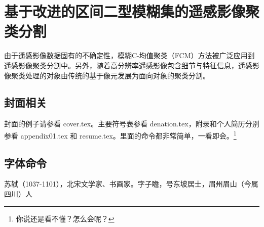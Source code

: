 
\chapter{基于改进的区间二型模糊集的遥感影像聚类分割}
\label{cha:chap03}

由于遥感影像数据固有的不确定性，模糊C-均值聚类（FCM）方法被广泛应用到遥感影像聚类分割中。另外，随着高分辨率遥感影像包含细节与特征信息，遥感影像聚类处理的对象由传统的基于像元发展为面向对象的聚类分割。

\section{封面相关}
封面的例子请参看 cover.tex。主要符号表参看 denation.tex，附录和个人简历分别参看 appendix01.tex
和 resume.tex。里面的命令都非常简单，一看即会。\footnote{你说还是看不懂？怎么会呢？}

\section{字体命令}
\label{sec:first}

苏轼（1037-1101），北宋文学家、书画家。字子瞻，号东坡居士，眉州眉山（今属四川）人
